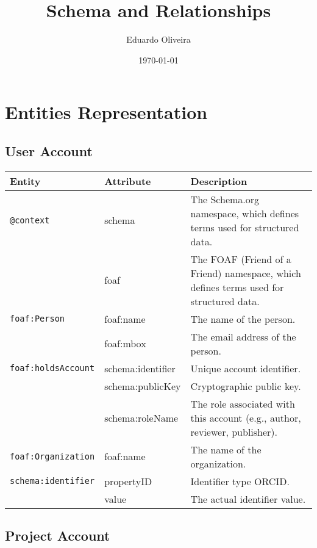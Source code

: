 \documentclass{article}
\title{Schema and Relationships}
\author{Eduardo Oliveira}
\date{\today}
\begin{document}
\maketitle

\section{Entities Representation}

\subsection{User Account}

\begin{longtable}{|l|l|p{8cm}|}
\hline
\textbf{Entity} & \textbf{Attribute} & \textbf{Description} \\
\hline
\texttt{@context} & schema & The Schema.org namespace, which defines terms used for structured data. \\
                      & foaf & The FOAF (Friend of a Friend) namespace, which defines terms used for structured data. \\
\hline
\texttt{foaf:Person} & foaf:name & The name of the person. \\
                     & foaf:mbox & The email address of the person. \\
\hline
\texttt{foaf:holdsAccount} & schema:identifier & Unique account identifier. \\
                           & schema:publicKey & Cryptographic public key. \\
                           & schema:roleName & The role associated with this account (e.g., author, reviewer, publisher). \\
\hline
\texttt{foaf:Organization} & foaf:name & The name of the organization. \\
\hline
\texttt{schema:identifier} & propertyID & Identifier type ORCID. \\
                           & value & The actual identifier value. \\
\hline
\end{longtable}

\subsection{Project Account}
\end{document}
